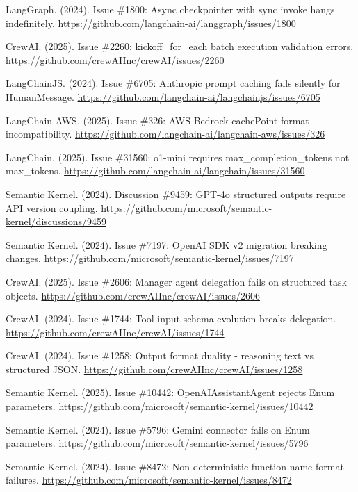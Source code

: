 \documentclass[11pt]{article}
\begin{document}
\begin{thebibliography}{99}
LangGraph. (2024). Issue \#1800: Async checkpointer with sync invoke hangs indefinitely. \url{https://github.com/langchain-ai/langgraph/issues/1800}

CrewAI. (2025). Issue \#2260: kickoff\_for\_each batch execution validation errors. \url{https://github.com/crewAIInc/crewAI/issues/2260}

LangChainJS. (2024). Issue \#6705: Anthropic prompt caching fails silently for HumanMessage. \url{https://github.com/langchain-ai/langchainjs/issues/6705}

LangChain-AWS. (2025). Issue \#326: AWS Bedrock cachePoint format incompatibility. \url{https://github.com/langchain-ai/langchain-aws/issues/326}

LangChain. (2025). Issue \#31560: o1-mini requires max\_completion\_tokens not max\_tokens. \url{https://github.com/langchain-ai/langchain/issues/31560}

Semantic Kernel. (2024). Discussion \#9459: GPT-4o structured outputs require API version coupling. \url{https://github.com/microsoft/semantic-kernel/discussions/9459}

Semantic Kernel. (2024). Issue \#7197: OpenAI SDK v2 migration breaking changes. \url{https://github.com/microsoft/semantic-kernel/issues/7197}

CrewAI. (2025). Issue \#2606: Manager agent delegation fails on structured task objects. \url{https://github.com/crewAIInc/crewAI/issues/2606}

CrewAI. (2024). Issue \#1744: Tool input schema evolution breaks delegation. \url{https://github.com/crewAIInc/crewAI/issues/1744}

CrewAI. (2024). Issue \#1258: Output format duality - reasoning text vs structured JSON. \url{https://github.com/crewAIInc/crewAI/issues/1258}

Semantic Kernel. (2025). Issue \#10442: OpenAIAssistantAgent rejects Enum parameters. \url{https://github.com/microsoft/semantic-kernel/issues/10442}

Semantic Kernel. (2024). Issue \#5796: Gemini connector fails on Enum parameters. \url{https://github.com/microsoft/semantic-kernel/issues/5796}

Semantic Kernel. (2024). Issue \#8472: Non-deterministic function name format failures. \url{https://github.com/microsoft/semantic-kernel/issues/8472}


\end{thebibliography}
\end{document}
